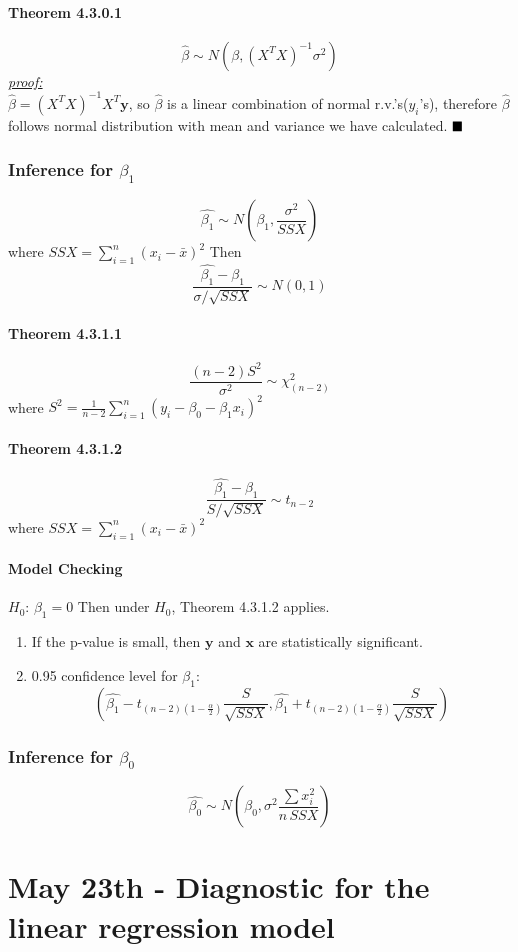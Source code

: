 \documentclass[11pt]{article}
\newcommand{\tb}[1]{\textbf{#1}}
\newcommand{\proof}[0]{\textit{\underline{proof:} }}
\newcommand{\vx}[0]{\tb{x}}
\newcommand{\vy}[0]{\tb{y}}
\newcommand{\qed}[0]{$\hfill\blacksquare$}
\begin{document}
\paragraph{Theorem 4.3.0.1} $$\hat{\beta} \sim N(\beta, (X^TX)^{-1}\sigma^2)$$
\proof\\
$\hat{\beta} = (X^TX)^{-1}X^T\vy$, so $\hat{\beta}$ is a linear combination of normal r.v.'s($y_i$'s), therefore $\hat{\beta}$ follows normal distribution with mean and variance we have calculated. \qed
\subsubsection{Inference for $\beta_1$}
$$\hat{\beta_1} \sim N(\beta_1, \frac{\sigma^2}{SSX})$$
where $SSX = \sum_{i=1}^n(x_i - \bar{x})^2$
Then $$\frac{\hat{\beta_1} - \beta_1}{\sigma/\sqrt{SSX}} \sim N(0,1)$$
\paragraph{Theorem 4.3.1.1}
$$\frac{(n-2)S^2}{\sigma^2} \sim \chi^2_{(n-2)}$$
where $S^2 = \frac{1}{n-2}\sum_{i=1}^n(y_i - \beta_0 - \beta_1x_i)^2$
\paragraph{Theorem 4.3.1.2}
$$\frac{\hat{\beta_1} - \beta_1}{S/\sqrt{SSX}} \sim t_{n-2}$$
where $SSX = \sum_{i=1}^n(x_i - \bar{x})^2$
\paragraph{Model Checking}
$H_0$: $\beta_1 = 0$
Then under $H_0$, Theorem 4.3.1.2 applies. 
\begin{enumerate}
    \item If the p-value is small, then $\vy$ and $\vx$ are statistically significant.
    \item 0.95 confidence level for $\beta_1$:
    $$(\hat{\beta_1} - t_{(n-2)(1-\frac{\alpha}{2})}\frac{S}{\sqrt{SSX}}, \hat{\beta_1} + t_{(n-2)(1-\frac{\alpha}{2})}\frac{S}{\sqrt{SSX}})$$
\end{enumerate}
\subsubsection{Inference for $\beta_0$}
$$\hat{\beta_0} \sim N(\beta_0, \sigma^2\frac{\sum x_i^2}{n\,SSX})$$

\section{May 23th - Diagnostic for the linear regression model}
\end{document}
